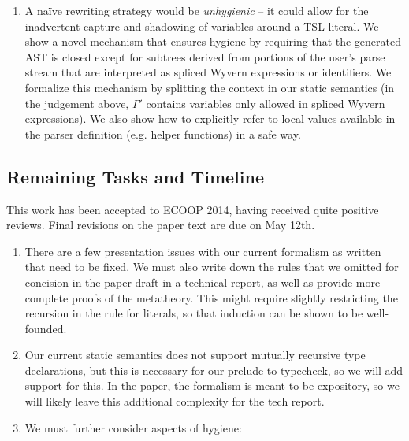 {\begin{enumerate}
\item A na\"ive rewriting strategy would be \emph{unhygienic} -- it could allow for the inadvertent capture and shadowing of variables around a TSL literal. We show a novel mechanism that ensures hygiene by requiring that the generated AST is closed except for subtrees derived from portions of the user's parse stream that are interpreted as spliced Wyvern expressions or identifiers. We formalize this mechanism by splitting the context in our static semantics (in the judgement above, $\Gamma'$ contains variables only allowed in spliced Wyvern expressions). We also show how to explicitly refer to local values available in the parser definition (e.g. helper functions) in a safe way. 
\end{enumerate}

\subsection{Remaining Tasks and Timeline}
This work has been accepted to ECOOP 2014, having received quite positive reviews. Final revisions on the paper text are due on May 12th.%
\begin{enumerate}
\item There are a few presentation issues with our current formalism as written that need to be fixed. We must also write down the rules that we omitted for concision in the paper draft in a technical report, as well as provide more complete proofs of the metatheory. This might require slightly restricting the recursion in the rule for literals, so that induction can be shown to be well-founded.
\item Our current static semantics does not support mutually recursive type declarations, but this is necessary for our prelude to typecheck, so we will add support for this. In the paper, the formalism is meant to be expository, so we will likely leave this additional complexity for the tech report.
\item We must further consider aspects of hygiene:
\begin{enumerate}

\end{enumerate}
\end{enumerate}}
